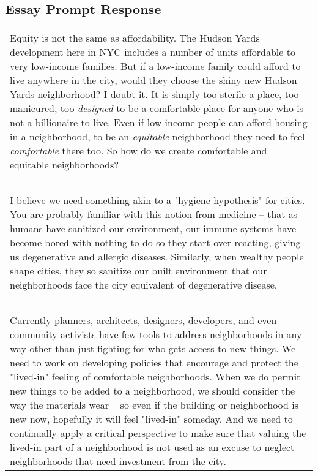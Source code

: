 \documentclass[letterpaper]{article}
\begin{document}
\begin{center}
\begin{minipage}[t]{13cm}
\section{Essay Prompt Response}
\begin{tabular}{p{13cm}}%
Equity is not the same as affordability. The Hudson Yards development
here in NYC includes a number of units affordable to very low-income
families. But if a low-income family could afford to live anywhere in
the city, would they choose the shiny new Hudson Yards neighborhood?
I doubt it. It is simply too sterile a place, too manicured, too
\emph{designed} to be a comfortable place for anyone who is not a
billionaire to live. Even if low-income people can afford housing in
a neighborhood, to be an \emph{equitable} neighborhood they need to
feel \emph{comfortable} there too. So how do we create comfortable and
equitable neighborhoods?
~\\ %
~\\ %
I believe we need something akin to a "hygiene hypothesis" for cities.
You are probably familiar with this notion from medicine – that
as humans have sanitized our environment, our immune systems have
become bored with nothing to do so they start over-reacting, giving us
degenerative and allergic diseases. Similarly, when wealthy people shape
cities, they so sanitize our built environment that our neighborhoods
face the city equivalent of degenerative disease.
~\\ %
~\\ %
Currently planners, architects, designers, developers, and even
community activists have few tools to address neighborhoods in any way
other than just fighting for who gets access to new things. We need to
work on developing policies that encourage and protect the "lived-in"
feeling of comfortable neighborhoods. When we do permit new things to
be added to a neighborhood, we should consider the way the materials
wear – so even if the building or neighborhood is new now, hopefully
it will feel "lived-in" someday. And we need to continually apply a
critical perspective to make sure that valuing the lived-in part of a
neighborhood is not used as an excuse to neglect neighborhoods that need
investment from the city.

\end{tabular}\\
\end{minipage} %
\end{center}
\vfill
\clearpage
%
\end{document}
